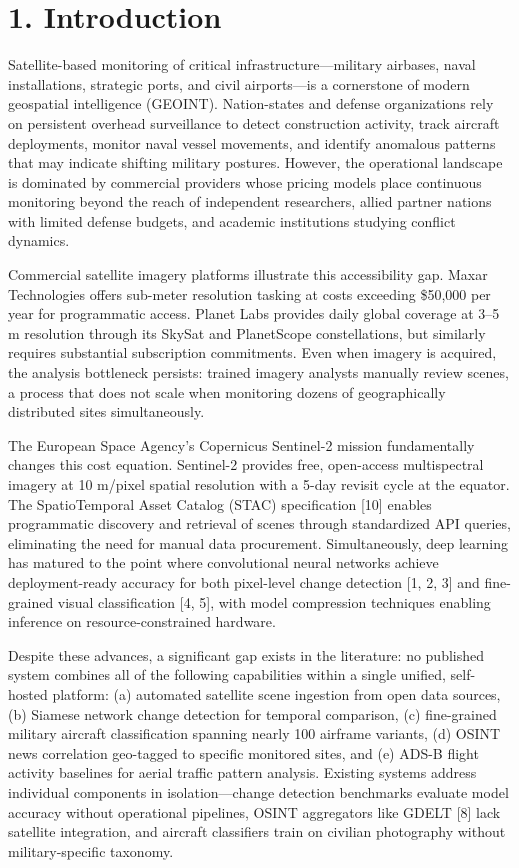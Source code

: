 \documentclass[11pt,a4paper]{article}
\begin{document}
\setcounter{page}{1}
\hypertarget{introduction}{%
\section{1. Introduction}\label{introduction}}

Satellite-based monitoring of critical infrastructure---military airbases, naval installations, strategic ports, and civil airports---is a cornerstone of modern geospatial intelligence (GEOINT). Nation-states and defense organizations rely on persistent overhead surveillance to detect construction activity, track aircraft deployments, monitor naval vessel movements, and identify anomalous patterns that may indicate shifting military postures. However, the operational landscape is dominated by commercial providers whose pricing models place continuous monitoring beyond the reach of independent researchers, allied partner nations with limited defense budgets, and academic institutions studying conflict dynamics.

Commercial satellite imagery platforms illustrate this accessibility gap. Maxar Technologies offers sub-meter resolution tasking at costs exceeding \$50,000 per year for programmatic access. Planet Labs provides daily global coverage at 3--5 m resolution through its SkySat and PlanetScope constellations, but similarly requires substantial subscription commitments. Even when imagery is acquired, the analysis bottleneck persists: trained imagery analysts manually review scenes, a process that does not scale when monitoring dozens of geographically distributed sites simultaneously.

The European Space Agency's Copernicus Sentinel-2 mission fundamentally changes this cost equation. Sentinel-2 provides free, open-access multispectral imagery at 10 m/pixel spatial resolution with a 5-day revisit cycle at the equator. The SpatioTemporal Asset Catalog (STAC) specification [10] enables programmatic discovery and retrieval of scenes through standardized API queries, eliminating the need for manual data procurement. Simultaneously, deep learning has matured to the point where convolutional neural networks achieve deployment-ready accuracy for both pixel-level change detection {[}1, 2, 3{]} and fine-grained visual classification {[}4, 5{]}, with model compression techniques enabling inference on resource-constrained hardware.

Despite these advances, a significant gap exists in the literature: no published system combines all of the following capabilities within a single unified, self-hosted platform: (a) automated satellite scene ingestion from open data sources, (b) Siamese network change detection for temporal comparison, (c) fine-grained military aircraft classification spanning nearly 100 airframe variants, (d) OSINT news correlation geo-tagged to specific monitored sites, and (e) ADS-B flight activity baselines for aerial traffic pattern analysis. Existing systems address individual components in isolation---change detection benchmarks evaluate model accuracy without operational pipelines, OSINT aggregators like GDELT [8] lack satellite integration, and aircraft classifiers train on civilian photography without military-specific taxonomy.
\end{document}
